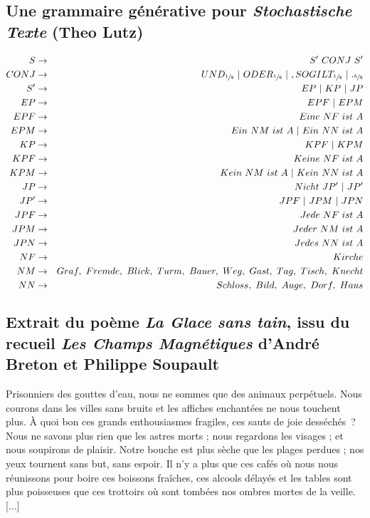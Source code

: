 \documentclass{article}
\begin{document}
		\subsection{Une grammaire générative pour \textit{Stochastische Texte} (Theo Lutz)}\label{lutz_grammar}
			\begin{eqnarray*}
				S &\rightarrow& S' \ CONJ \ S'\\
				CONJ &\rightarrow& UND_{\sfrac{1}{8}} \ | \ ODER_{\sfrac{1}{8}} \ | \ , SO GILT_{\sfrac{1}{8}} \ | \ ._{\sfrac{5}{8}} \\
				S' &\rightarrow& EP\ | \ KP \ |\ JP\\
				EP & \rightarrow& EPF \ | \ EPM\\
				EPF & \rightarrow& Eine \ NF \ ist \ A\\
				EPM & \rightarrow& Ein \ NM \ ist \ A \ | \ Ein \ NN \ ist \ A\\
				KP & \rightarrow& KPF \ | \ KPM\\
				KPF & \rightarrow& Keine \ NF \ ist \ A\\
				KPM & \rightarrow& Kein \ NM \ ist \ A \ | \ Kein \ NN \ ist \ A\\
				JP & \rightarrow& Nicht \ JP' \ | \ JP'\\
				JP' & \rightarrow& JPF \ | \ JPM \ | \ JPN\\
				JPF & \rightarrow& Jede \ NF \ ist \ A\\
				JPM & \rightarrow& Jeder \ NM \ ist \ A\\
				JPN & \rightarrow& Jedes \ NN \ ist \ A\\
				NF & \rightarrow& Kirche\\
				NM & \rightarrow& Graf, \ Fremde, \ Blick, \ Turm, \ Bauer, \ Weg, \ Gast, \ Tag, \ Tisch, \ Knecht\\
				NN &\rightarrow& Schloss, \ Bild, \ Auge, \ Dorf, \ Haus\\
			\end{eqnarray*}
			\newpage
		\subsection{Extrait du poème \textit{La Glace sans tain}, issu du recueil \textit{Les Champs Magnétiques} d'André Breton et Philippe Soupault}
			Prisonniers des gouttes d’eau, nous ne sommes que des animaux perpétuels. Nous courons dans les villes sans bruits et les affiches
			enchantées ne nous touchent plus. À quoi bon ces grands enthousiasmes
			fragiles, ces sauts de joie desséchés~? Nous ne savons plus rien que les
			astres morts ; nous regardons les visages ; et nous soupirons de plaisir.
			Notre bouche est plus sèche que les plages perdues ; nos yeux tournent
			sans but, sans espoir. Il n’y a plus que ces cafés où nous nous réunissons
			pour boire ces boissons fraîches, ces alcools délayés et les tables sont plus
			poisseuses que ces trottoirs où sont tombées nos ombres mortes de la
			veille. [...]
			\newpage
\end{document}
